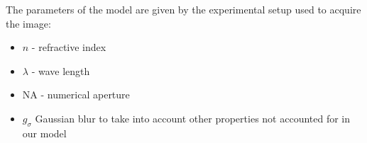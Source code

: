 \documentclass[a0paper,portrait,fontscale=0.35]{baposter}
\theoremstyle{plain}
\theoremstyle{plain}
\theoremstyle{definition}
\theoremstyle{plain}
\theoremstyle{definition}
\begin{document}
\begin{poster}
{  \vspace{10pt}
  \begin{minipage}[t]{\textwidth}
    \begin{minipage}[t]{0.38\textwidth}
      The parameters of the model are given by
      the experimental setup used to acquire the image:
      \begin{itemize}
        \item $n$ - refractive index
        \item $\lambda$ - wave length
        \item NA - numerical aperture
        \item $g_{\sigma}$ Gaussian blur to take into account
          other properties not accounted for in our model
      \end{itemize}
    \end{minipage}
    \begin{minipage}[t]{0.3\textwidth}
      \centering


\end{minipage}
\end{minipage}}
\end{poster}
\end{document}
